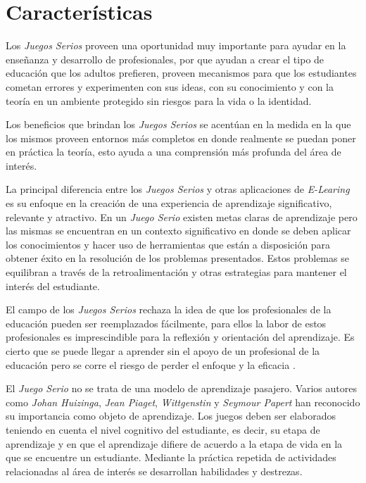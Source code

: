 \section{Características}

Los \emph{Juegos Serios} proveen una oportunidad muy importante para ayudar en la
enseñanza y desarrollo de profesionales, por que ayudan a crear el tipo de
educación que los adultos prefieren, proveen mecanismos para que los estudiantes
cometan errores y experimenten con sus ideas, con su conocimiento y con la
teoría en un ambiente protegido sin riesgos para la vida o la identidad. 

Los beneficios que brindan los \emph{Juegos Serios} se acentúan en la medida en
la que los mismos proveen entornos más completos en donde realmente se puedan
poner en práctica la teoría, esto ayuda a una comprensión más profunda del área
de interés.

La principal diferencia entre los \emph{Juegos Serios} y otras aplicaciones de
\emph{E-Learing} es su enfoque en la creación de una experiencia de aprendizaje
significativo, relevante y atractivo. En un \emph{Juego Serio} existen metas
claras de aprendizaje pero las mismas se encuentran en un contexto significativo
en donde se deben aplicar los conocimientos y hacer uso de herramientas que
están a disposición para obtener éxito en la resolución de los problemas
presentados. Estos problemas se equilibran a través de la retroalimentación y
otras estrategias para mantener el interés del estudiante\cite{papertian:const}.

El campo de los \emph{Juegos Serios} rechaza la idea de que los profesionales de
la educación pueden ser reemplazados fácilmente, para ellos la labor de estos
profesionales es imprescindible para la reflexión y orientación del aprendizaje.
Es cierto que se puede llegar a aprender sin el apoyo de un profesional de la
educación pero se corre el riesgo de perder el enfoque y la eficacia
\cite{elearning:seiousgames}. 

El \emph{Juego Serio} no se trata de una modelo de aprendizaje pasajero. Varios
autores como \emph{Johan Huizinga}, \emph{Jean Piaget}, \emph{Wittgenstin} y
\emph{Seymour Papert} han reconocido su importancia como objeto de aprendizaje.
Los juegos deben ser elaborados teniendo en cuenta el nivel cognitivo del
estudiante, es decir, su etapa de aprendizaje y en que el aprendizaje difiere de
acuerdo a la etapa de vida en la que se encuentre un estudiante. Mediante la
práctica repetida de actividades relacionadas al área de interés se desarrollan
habilidades y destrezas\cite{education:games}.

